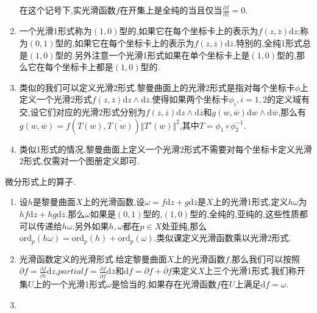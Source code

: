 \begin{enumerate}
    在这个记号下,实光滑函数$f$在开集上是全纯的当且仅当$\frac{\partial f}{\partial\overline{z}}=0$.
    \item 一个光滑1形式称为$(1,0)$型的,如果它在每个坐标卡上的表示为$f(z,\overline{z})\mathrm{d}z$;称为$(0,1)$型的,如果它在每个坐标卡上的表示为$f(z,\overline{z})\mathrm{d}\overline{z}$.特别的,全纯1形式总是$(1,0)$型的.另外注意一个光滑1形式如果在单个坐标卡上是$(1,0)$型的,那么它在每个坐标卡上都是$(1,0)$型的.
    \item 类似的我们可以定义光滑2形式.黎曼曲面上的光滑2形式是指对每个坐标卡$\phi$上定义一个光滑2形式$f(z,\overline{z})\mathrm{d}z\wedge\mathrm{d}\overline{z}$.使得如果两个坐标卡$\phi_i,i=1,2$的定义域有交,设它们对应的光滑2形式分别为$f(z,\overline{z})\mathrm{d}z\wedge\mathrm{d}\overline{z}$和$g(w,\overline{w})\mathrm{d}w\wedge\mathrm{d}\overline{w}$,那么有$g(w,\overline{w})=f(T(w),\overline{T(w)})\Vert T'(w)\Vert^2$,其中$T=\phi_1\circ\phi_2^{-1}$.
    \item 类似1形式的情况,黎曼曲面上定义一个光滑2形式不需要对每个坐标卡定义光滑2形式,仅需对一个图册定义即可.
\end{enumerate}

微分形式上的算子.
\begin{enumerate}
	\item 设$h$是黎曼曲面$X$上的光滑函数,设$\omega=f\mathrm{d}z+g\mathrm{d}\overline{z}$是$X$上的光滑1形式,定义$h\omega$为$hf\mathrm{d}z+hg\mathrm{d}\overline{z}$.那么$\omega$如果是$(0,1)$型的,$(1,0)$型的,全纯的,亚纯的,这些性质都可以传递给$h\omega$.另外如果$h,\omega$都在$p\in X$处亚纯,那么$\mathrm{ord}_p(h\omega)=\mathrm{ord}_p(h)+\mathrm{ord}_p(\omega)$.类似课定义光滑函数乘以光滑2形式.
	\item 光滑函数定义的光滑形式.给定黎曼曲面$X$上的光滑函数$f$,那么我们可以按照$\partial f=\frac{\partial f}{\partial z}\mathrm{d}z$,$\overline{partial}f=\frac{\partial f}{\partial\overline{f}}\mathrm{d}\overline{z}$和$\mathrm{d}f=\partial f+\overline{\partial}f$来定义$X$上三个光滑1形式.我们称开集$U$上的一个光滑1形式$\omega$是恰当的,如果存在光滑函数$f$在$U$上满足$\mathrm{d}f=\omega$.
	\item 
	
\end{enumerate}



















